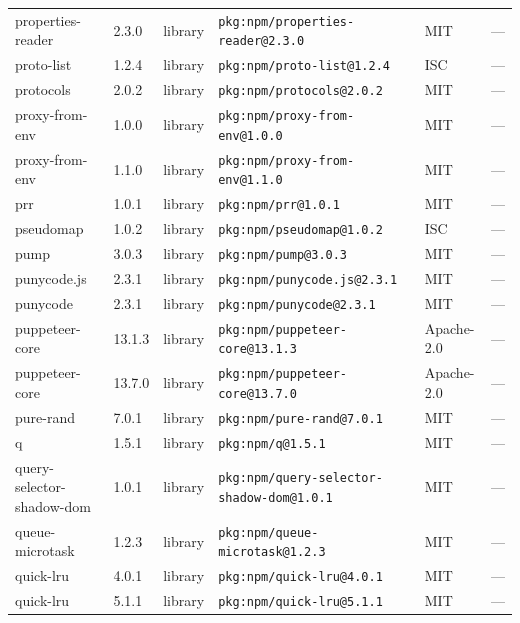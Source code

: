 \documentclass[11pt,a4paper]{article}
\begin{document}
\begin{longtable}{|p{4cm}|p{2cm}|p{1.6cm}|p{5cm}|p{1.5cm}|p{3.5cm}|}
\raggedright properties-reader & 2.3.0 & library & \small\texttt{pkg:npm/properties-reader@2.3.0} & MIT & \small — \\
\raggedright proto-list & 1.2.4 & library & \small\texttt{pkg:npm/proto-list@1.2.4} & ISC & \small — \\
\raggedright protocols & 2.0.2 & library & \small\texttt{pkg:npm/protocols@2.0.2} & MIT & \small — \\
\raggedright proxy-from-env & 1.0.0 & library & \small\texttt{pkg:npm/proxy-from-env@1.0.0} & MIT & \small — \\
\raggedright proxy-from-env & 1.1.0 & library & \small\texttt{pkg:npm/proxy-from-env@1.1.0} & MIT & \small — \\
\raggedright prr & 1.0.1 & library & \small\texttt{pkg:npm/prr@1.0.1} & MIT & \small — \\
\raggedright pseudomap & 1.0.2 & library & \small\texttt{pkg:npm/pseudomap@1.0.2} & ISC & \small — \\
\raggedright pump & 3.0.3 & library & \small\texttt{pkg:npm/pump@3.0.3} & MIT & \small — \\
\raggedright punycode.js & 2.3.1 & library & \small\texttt{pkg:npm/punycode.js@2.3.1} & MIT & \small — \\
\raggedright punycode & 2.3.1 & library & \small\texttt{pkg:npm/punycode@2.3.1} & MIT & \small — \\
\raggedright puppeteer-core & 13.1.3 & library & \small\texttt{pkg:npm/puppeteer-core@13.1.3} & Apache-2.0 & \small — \\
\raggedright puppeteer-core & 13.7.0 & library & \small\texttt{pkg:npm/puppeteer-core@13.7.0} & Apache-2.0 & \small — \\
\raggedright pure-rand & 7.0.1 & library & \small\texttt{pkg:npm/pure-rand@7.0.1} & MIT & \small — \\
\raggedright q & 1.5.1 & library & \small\texttt{pkg:npm/q@1.5.1} & MIT & \small — \\
\raggedright query-selector-shadow-dom & 1.0.1 & library & \small\texttt{pkg:npm/query-selector-shadow-dom@1.0.1} & MIT & \small — \\
\raggedright queue-microtask & 1.2.3 & library & \small\texttt{pkg:npm/queue-microtask@1.2.3} & MIT & \small — \\
\raggedright quick-lru & 4.0.1 & library & \small\texttt{pkg:npm/quick-lru@4.0.1} & MIT & \small — \\
\raggedright quick-lru & 5.1.1 & library & \small\texttt{pkg:npm/quick-lru@5.1.1} & MIT & \small — \\

\end{longtable}
\end{document}
